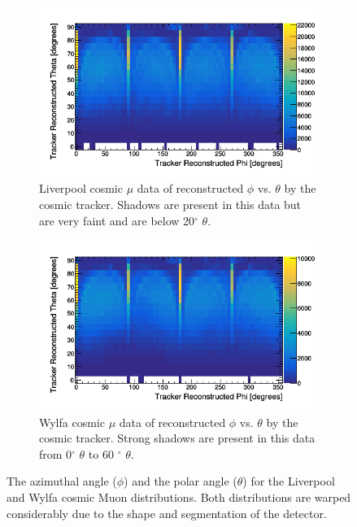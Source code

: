 \documentclass[12pt,a4paper]{article}
\begin{document}
\begin{figure}[H]
\centering
\begin{subfigure}{.5\textwidth}
  \centering
  \includegraphics[width=\linewidth]{ReconstructedPhiTheta/pVsTLiverpoolRedo.png}
  \captionsetup{width=.9\linewidth}
  \caption{Liverpool cosmic $\mu$ data of reconstructed $\phi$ vs. $\theta$ by the cosmic tracker. Shadows are present in this data but are very faint and are below 20$^{\circ}$ $\theta$.}
  \label{subFig:pvtLiverpool}
\end{subfigure}%
\begin{subfigure}{.5\textwidth}
  \centering
  \includegraphics[width=\linewidth]{ReconstructedPhiTheta/pVsTWylfaRedo.png}
  \captionsetup{width=.9\linewidth}
  \caption{Wylfa cosmic $\mu$ data of reconstructed $\phi$ vs. $\theta$ by the cosmic tracker. Strong shadows are present in this data from 0$^{\circ}$ $\theta$ to 60 $^{\circ}$ $\theta$.}
  \label{subFig:pvtWylfa}
\end{subfigure}
\caption{The azimuthal angle ($\phi$) and the polar angle ($\theta$) for the Liverpool and Wylfa cosmic Muon distributions. Both distributions are warped considerably due to the shape and segmentation of the detector.}
\label{fig:pvtWylfaAndLiverpool}
\end{figure}
\end{document}
